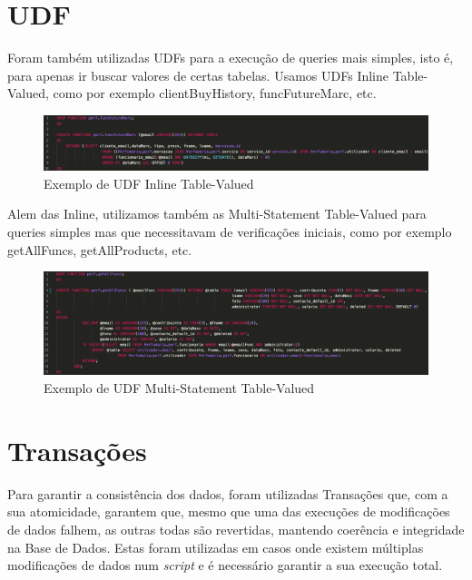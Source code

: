 \documentclass[10pt,portuguese]{article}
\begin{document}
\clearpage

\section{UDF}

\par Foram também utilizadas UDFs para a execução de queries mais simples, isto é, para apenas ir buscar valores de certas tabelas. Usamos UDFs Inline Table-Valued, como por exemplo clientBuyHistory, funcFutureMarc, etc.

\begin{figure}[!h]
    \centering
    \includegraphics[width=\textwidth]{images/funcFutureMarc.png}
    \caption{Exemplo de UDF Inline Table-Valued}
\end{figure}

\par Alem das Inline, utilizamos também as Multi-Statement Table-Valued para queries simples mas que necessitavam de verificações iniciais, como por exemplo getAllFuncs, getAllProducts, etc.

\begin{figure}[!h]
    \centering
    \includegraphics[width=\textwidth]{images/getAllFuncs.png}
    \caption{Exemplo de UDF Multi-Statement Table-Valued}
\end{figure}

\clearpage

\section{Transações}

\par Para garantir a consistência dos dados, foram utilizadas Transações que, com a sua atomicidade, garantem que, mesmo que uma das execuções de modificações de dados falhem, as outras todas são revertidas, mantendo coerência e integridade na Base de Dados. Estas foram utilizadas em casos onde existem múltiplas modificações de dados num \textit{script} e é necessário garantir a sua execução total.
\end{document}
